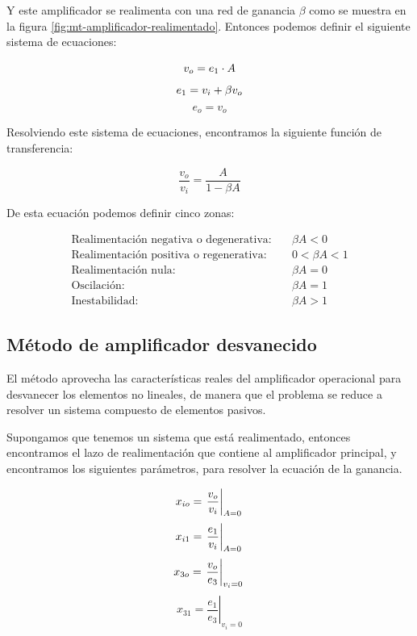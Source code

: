 Y este amplificador se realimenta con una red de ganancia $\beta$ como se muestra en la figura \ref{fig:mt-amplificador-realimentado}. Entonces podemos definir el siguiente sistema de ecuaciones:

\begin{equation}
    v_o = e_1 \cdot A \\
\end{equation}
\begin{equation}
    e_1 = v_i + \beta v_o \\
\end{equation}
\begin{equation}
    e_o = v_o
\end{equation}

Resolviendo este sistema de ecuaciones, encontramos la siguiente función de transferencia:

\begin{equation}
    \frac{v_o}{v_i} = \frac{A}{1 - \beta A}
\end{equation}

De esta ecuación podemos definir cinco zonas:

\begin{align*}
\text{Realimentación negativa o degenerativa:} & \quad \beta A < 0 \\
\text{Realimentación positiva o regenerativa:} & \quad 0 < \beta A < 1 \\
\text{Realimentación nula:} & \quad \beta A = 0 \\
\text{Oscilación:} & \quad \beta A = 1 \\
\text{Inestabilidad:} & \quad \beta A > 1
\end{align*}

\subsection{Método de amplificador desvanecido}

 El método aprovecha las características reales del
amplificador operacional para desvanecer los elementos no lineales, de manera que el problema se reduce a resolver un sistema compuesto de elementos pasivos.

Supongamos que tenemos un sistema que está realimentado, entonces encontramos el lazo de realimentación que contiene al amplificador principal,
y encontramos los siguientes parámetros, para resolver la ecuación de la ganancia.


\begin{equation}
    x_{io} = \left. \frac{v_o}{v_i} \right|_{A=0} \\
\end{equation}
\begin{equation}
x_{i1} = \left. \frac{e_1}{v_i} \right|_{A=0} \\
\end{equation}
\begin{equation}
x_{3o} = \left. \frac{v_o}{e_3} \right|_{v_i=0} \\
\end{equation}
\begin{equation}
    x_{31} = \left. \frac{e_1}{e_3} \right|_{v_i=0}
\end{equation}

